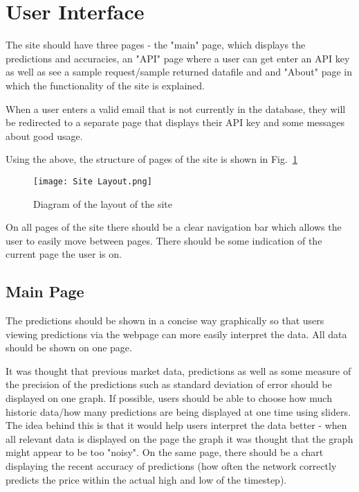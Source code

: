     \section{User Interface}

        The site should have three pages - the "main" page, which displays the predictions and accuracies, an "API" page where a user can get enter an API key as well as see a sample request/sample returned datafile and and "About" page in which the functionality of the site is explained.

        When a user enters a valid email that is not currently in the database, they will be redirected to a separate page that displays their API key and some messages about good usage.

        Using the above, the structure of pages of the site is shown in Fig.~\ref{fig:site_layout}

        \begin{figure}[htbp]
            \centering
            \texttt{[image: Site Layout.png]}
            \caption{Diagram of the layout of the site}
            \label{fig:site_layout}
        \end{figure}

        On all pages of the site there should be a clear navigation bar which allows the user to easily move between pages. There should be some indication of the current page the user is on.

        \subsection{Main Page}
        The predictions should be shown in a concise way graphically so that users viewing predictions via the webpage can more easily interpret the data. All data should be shown on one page.
        
        It was thought that previous market data, predictions as well as some measure of the precision of the predictions such as standard deviation of error should be displayed on one graph. If possible, users should be able to choose how much historic data/how many predictions are being displayed at one time using sliders. The idea behind this is that it would help users interpret the data better - when all relevant data is displayed on the page the graph it was thought that the graph might appear to be too "noisy". On the same page, there should be a chart displaying the recent accuracy of predictions (how often the network correctly predicts the price within the actual high and low of the timestep). 

